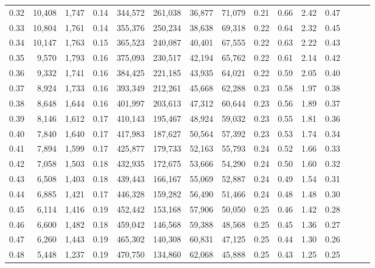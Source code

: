 \begin{tabular}{rrrrrrrrrrrrrrr}
0.32 &  10,408 &  1,747 &  0.14 &  344,572 &  261,038 &   36,877 &   71,079 &  0.21 &  0.66 &  2.42 &      0.47 \\
0.33 &  10,804 &  1,761 &  0.14 &  355,376 &  250,234 &   38,638 &   69,318 &  0.22 &  0.64 &  2.32 &      0.45 \\
0.34 &  10,147 &  1,763 &  0.15 &  365,523 &  240,087 &   40,401 &   67,555 &  0.22 &  0.63 &  2.22 &      0.43 \\
0.35 &   9,570 &  1,793 &  0.16 &  375,093 &  230,517 &   42,194 &   65,762 &  0.22 &  0.61 &  2.14 &      0.42 \\
0.36 &   9,332 &  1,741 &  0.16 &  384,425 &  221,185 &   43,935 &   64,021 &  0.22 &  0.59 &  2.05 &      0.40 \\
0.37 &   8,924 &  1,733 &  0.16 &  393,349 &  212,261 &   45,668 &   62,288 &  0.23 &  0.58 &  1.97 &      0.38 \\
0.38 &   8,648 &  1,644 &  0.16 &  401,997 &  203,613 &   47,312 &   60,644 &  0.23 &  0.56 &  1.89 &      0.37 \\
0.39 &   8,146 &  1,612 &  0.17 &  410,143 &  195,467 &   48,924 &   59,032 &  0.23 &  0.55 &  1.81 &      0.36 \\
0.40 &   7,840 &  1,640 &  0.17 &  417,983 &  187,627 &   50,564 &   57,392 &  0.23 &  0.53 &  1.74 &      0.34 \\
0.41 &   7,894 &  1,599 &  0.17 &  425,877 &  179,733 &   52,163 &   55,793 &  0.24 &  0.52 &  1.66 &      0.33 \\
0.42 &   7,058 &  1,503 &  0.18 &  432,935 &  172,675 &   53,666 &   54,290 &  0.24 &  0.50 &  1.60 &      0.32 \\
0.43 &   6,508 &  1,403 &  0.18 &  439,443 &  166,167 &   55,069 &   52,887 &  0.24 &  0.49 &  1.54 &      0.31 \\
0.44 &   6,885 &  1,421 &  0.17 &  446,328 &  159,282 &   56,490 &   51,466 &  0.24 &  0.48 &  1.48 &      0.30 \\
0.45 &   6,114 &  1,416 &  0.19 &  452,442 &  153,168 &   57,906 &   50,050 &  0.25 &  0.46 &  1.42 &      0.28 \\
0.46 &   6,600 &  1,482 &  0.18 &  459,042 &  146,568 &   59,388 &   48,568 &  0.25 &  0.45 &  1.36 &      0.27 \\
0.47 &   6,260 &  1,443 &  0.19 &  465,302 &  140,308 &   60,831 &   47,125 &  0.25 &  0.44 &  1.30 &      0.26 \\
0.48 &   5,448 &  1,237 &  0.19 &  470,750 &  134,860 &   62,068 &   45,888 &  0.25 &  0.43 &  1.25 &      0.25 \\

\end{tabular}
